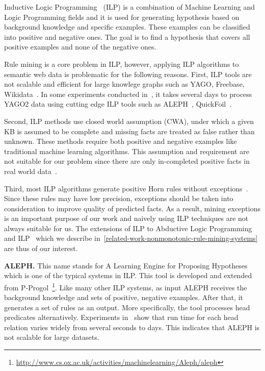 Inductive Logic Programming~\cite{ref9} (ILP) is a combination of Machine Learning and Logic Programming fields and it is used for generating hypothesis based on background knowledge and specific examples. These examples can be classified into positive and negative ones. The goal is to find a hypothesis that covers all positive examples and none of the negative ones.

Rule mining is a core problem in ILP, however, applying ILP algorithms to semantic web data is problematic for the following reasons. First, ILP tools are not scalable and efficient for large knowlege graphs such as YAGO, Freebase, Wikidata~\cite{ref10}. In some experiments conducted in~\cite{ref10}, it takes several days to process YAGO2 data using cutting edge ILP tools such as ALEPH~\cite{ref14, ref10}, QuickFoil~\cite{ref15, ref10}.

Second, ILP methods use closed world assumption (CWA), under which a given KB is assumed to be complete and missing facts are treated as false rather than unknown. These methods require both positive and negative examples like traditional machine learning algorithms. This assumption and requirement are not suitable for our problem since there are only in-completed positive facts in real world data~\cite{ref10}.

Third, most ILP algorithms generate positive Horn rules without exceptions~\cite{ref11}. Since these rules may have low precision, exceptions should be taken into consideration to improve quality of predicted facts. As a result, mining exceptions is an important purpose of our work and naively using ILP techniques are not always suitable for us. The extensions of ILP to Abductive Logic Programming and ILP~\cite{ref11} which we describe in~\ref{related-work-nonmonotonic-rule-mining-systems} are thus of our interest.

\textbf{ALEPH.} This name stands for A Learning Engine for Proposing Hypotheses which is one of the typical systems in ILP. This tool is developed and extended from P-Progol~\footnote{\url{http://www.cs.ox.ac.uk/activities/machinelearning/Aleph/aleph}}. Like many other ILP systems, as input ALEPH receives the background knowledge and sets of positive, negative examples. After that, it generates a set of rules as an output. More specifically, the tool processes head predicates alternatively. Experiments in~\cite{ref10} show that run time for each head relation varies widely from several seconds to days. This indicates that ALEPH is not scalable for large datasets.

